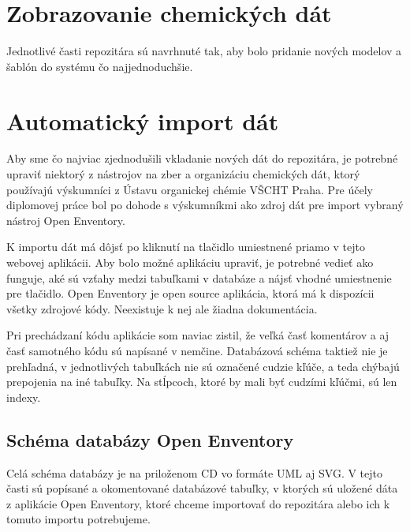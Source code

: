 \documentclass[thesis=M,slovak]{FITthesis}[2013/05/06]
\begin{document}
\section{Zobrazovanie chemických dát}
Jednotlivé časti repozitára sú navrhnuté tak, aby bolo pridanie nových modelov a šablón do systému čo najjednoduchšie.


\section{Automatický import dát}
Aby sme čo najviac zjednodušili vkladanie nových dát do repozitára, je potrebné upraviť niektorý z nástrojov na zber a organizáciu chemických dát, ktorý používajú výskumníci z Ústavu organickej chémie VŠCHT Praha. Pre účely diplomovej práce bol po dohode s výskumníkmi ako zdroj dát pre import vybraný nástroj Open Enventory.

K importu dát má dôjsť po kliknutí na tlačidlo umiestnené priamo v tejto webovej aplikácii. Aby bolo možné aplikáciu upraviť, je potrebné vedieť ako funguje, aké sú vzťahy medzi tabuľkami v databáze a nájsť vhodné umiestnenie pre tlačidlo.
Open Enventory je open source aplikácia, ktorá má k dispozícii všetky zdrojové kódy. Neexistuje k nej ale žiadna dokumentácia.

Pri prechádzaní kódu aplikácie som naviac zistil, že veľká časť komentárov a aj časť samotného kódu sú napísané v nemčine. Databázová schéma taktiež nie je prehľadná, v jednotlivých tabuľkách nie sú označené cudzie kľúče, a teda chýbajú prepojenia na iné tabuľky. Na stĺpcoch, ktoré by mali byť cudzími kľúčmi, sú len indexy.

\subsection{Schéma databázy Open Enventory}
Celá schéma databázy je na priloženom CD vo formáte UML aj SVG. V tejto časti sú popísané a okomentované databázové tabuľky, v ktorých sú uložené dáta z aplikácie Open Enventory, ktoré chceme importovať do repozitára alebo ich k tomuto importu potrebujeme.
\end{document}
